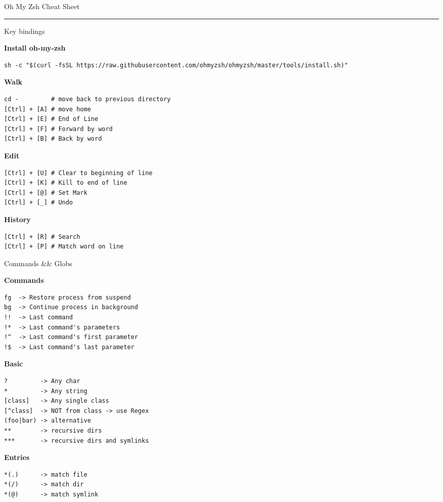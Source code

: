 \documentclass[10pt]{article}
\begin{document}
\pagestyle{empty}

{\titlefont\large \color{mygreen}Oh My Zsh Cheat Sheet}\\
\textcolor{lightgray}{\rule{\linewidth}{0.5pt}}
\vspace{0.5em}

\setlength{\columnsep}{20pt}
\begin{multicols}{2}

{\titlefont\color{blueheader}\faNetworkWired\quad Key bindings }\vspace{5pt}

\textbf{\color{blueheader}Install oh-my-zsh}
\begin{lstlisting}
sh -c "$(curl -fsSL https://raw.githubusercontent.com/ohmyzsh/ohmyzsh/master/tools/install.sh)"
\end{lstlisting}

  \textbf{\color{blueheader}Walk}
\begin{lstlisting}
cd -         # move back to previous directory
[Ctrl] + [A] # move home
[Ctrl] + [E] # End of Line 
[Ctrl] + [F] # Forward by word 
[Ctrl] + [B] # Back by word  
\end{lstlisting}

\textbf{\color{blueheader} Edit}
\begin{lstlisting}
[Ctrl] + [U] # Clear to beginning of line 
[Ctrl] + [K] # Kill to end of line
[Ctrl] + [@] # Set Mark
[Ctrl] + [_] # Undo
\end{lstlisting}

\textbf{\color{blueheader}History}
\begin{lstlisting}
[Ctrl] + [R] # Search 
[Ctrl] + [P] # Match word on line  
\end{lstlisting}

\vfill\null\columnbreak

  {\titlefont\color{blueheader}\faTools\quad Commands && Globs}\vspace{5pt}

\textbf{\color{blueheader}Commands}
\begin{lstlisting}
fg  -> Restore process from suspend
bg  -> Continue process in background  
!!  -> Last command 
!*  -> Last command's parameters 
!^  -> Last command's first parameter 
!$  -> Last command's last parameter 
\end{lstlisting}

\textbf{\color{blueheader}Basic}
\begin{lstlisting}
?         -> Any char
*         -> Any string 
[class]   -> Any single class
[^class]  -> NOT from class -> use Regex 
(foo|bar) -> alternative
**        -> recursive dirs 
***       -> recursive dirs and symlinks 
\end{lstlisting}

\textbf{\color{blueheader}Entries}
\begin{lstlisting}
*(.)      -> match file 
*(/)      -> match dir
*(@)      -> match symlink
\end{lstlisting}

\end{multicols}
\end{document}
